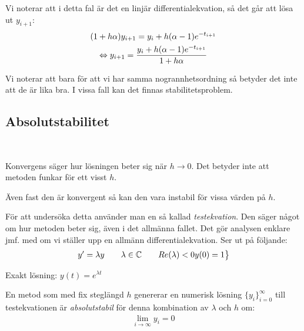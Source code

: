 \noindent Vi noterar att i detta fal är det en linjär differentialekvation, så det går att lösa ut $y_{i+1}$:
\begin{equation*}
  \begin{gathered}
    (1+h\alpha)y_{i+1}=y_i+h(\alpha-1)e^{-t_{i+1}}\\
    \Leftrightarrow y_{i+1} = \dfrac{y_i+h(\alpha-1)e^{-t_{i+1}}}{1+h\alpha}
  \end{gathered}
\end{equation*}
\par\bigskip
\noindent Vi noterar att bara för att vi har samma nogrannhetsordning så betyder det inte att de är lika bra. I vissa fall kan det finnas stabilitetsproblem.
\par\bigskip
\subsection{Absolutstabilitet}\hfill\\
\par\bigskip
\noindent Konvergens säger hur lösningen beter sig när $h\to0$. Det betyder inte att metoden funkar för ett visst $h$.\par
\noindent Även fast den är konvergent så kan den vara instabil för vissa värden på $h$.\par
\noindent För att undersöka detta använder man en så kallad \textit{testekvation}. Den säger något om hur metoden beter sig, även i det allmänna fallet. Det gör analysen enklare jmf. med om vi ställer upp en allmänn differentialekvation. Ser ut på följande:
\begin{equation*}
  \begin{gathered}
    \begin{rcases*}
      y^{\prime} = \lambda y\qquad\lambda\in\C\qquad Re(\lambda)<0
      y(0)=1
    \end{rcases*}
  \end{gathered}
\end{equation*}
\par\bigskip
\noindent Exakt lösning: $y(t) = e^{\lambda t}$
\par\bigskip
\noindent En metod som med fix steglängd $h$ genererar en numerisk lösning $\{y_i\}_{i=0}^{\infty}$ till testekvationen är \textit{absolutstabil} för denna kombination av $\lambda$ och $h$ om:
\begin{equation*}
  \begin{gathered}
    \lim_{i\to\infty}y_i=0
  \end{gathered}
\end{equation*}
